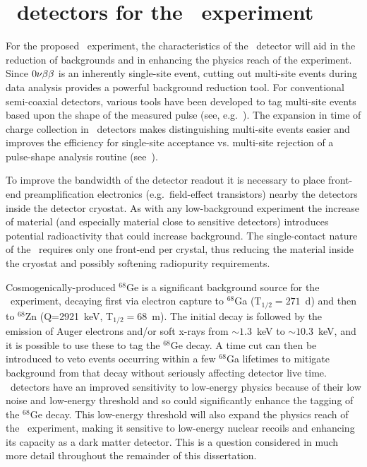 	\section{\ppc~detectors for the \MJ~experiment}

For the proposed \MJ~experiment, the characteristics of the \ppc~detector
will aid in the reduction of backgrounds and in enhancing the physics reach of
the experiment.  Since $0 \nu \beta \beta$ is an inherently single-site event, cutting out
multi-site events during data analysis provides a powerful background reduction
tool.  For conventional semi-coaxial detectors, various tools have been developed
to tag multi-site events based upon the shape of the measured pulse (see,
e.g.~\cite{Aal00}).  The expansion in time
of charge collection in \ppc~detectors makes distinguishing multi-site events easier and improves the efficiency for single-site acceptance vs. multi-site rejection of a pulse-shape analysis routine (see~\cite{Budjas:2009zu,Ren10}).

To improve the bandwidth of the detector readout it is necessary to
place front-end preamplification electronics (e.g.~field-effect transistors) nearby the detectors
inside the detector cryostat.  As with any low-background 
experiment the increase of material (and especially material close to
sensitive detectors) introduces potential radioactivity that could
increase background.  The single-contact nature of the \ppc~requires only one
front-end per crystal, thus reducing the material inside the cryostat and possibly
softening radiopurity requirements.

Cosmogenically-produced $^{68}$Ge is a significant background
source for the \MJ~experiment, decaying first via electron capture to $^{68}$Ga
(T$_{1/2}=271$~d) and then to $^{68}$Zn (Q=2921~keV, T$_{1/2}=68$~m).  The
initial decay is followed by the emission of Auger electrons and/or soft x-rays
from $\sim1.3$~keV to $\sim10.3$~keV, and it is possible to use these to tag
the $^{68}$Ge decay.  A time cut can then be introduced to veto events
occurring within a few $^{68}$Ga lifetimes to mitigate background from that
decay without seriously affecting detector live time.   \ppc~detectors have an
improved sensitivity to low-energy physics because of their low noise and 
low-energy threshold and so could significantly enhance the tagging of the
$^{68}$Ge decay.  This low-energy threshold will also
expand the physics reach of the \MJ~experiment, making it sensitive to
low-energy nuclear recoils and enhancing its capacity as a dark matter
detector.  This is a question considered in much more detail 
throughout the remainder of this dissertation.


